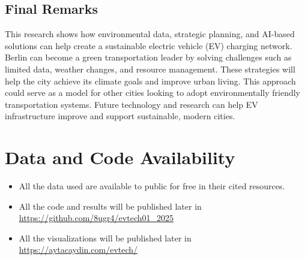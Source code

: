 \subsection{Final Remarks}
This research shows how environmental data, strategic planning, and AI-based solutions can help create a sustainable electric vehicle (EV) charging network. Berlin can become a green transportation leader by solving challenges such as limited data, weather changes, and resource management. These strategies will help the city achieve its climate goals and improve urban living. This approach could serve as a model for other cities looking to adopt environmentally friendly transportation systems. Future technology and research can help EV infrastructure improve and support sustainable, modern cities.
\section{Data and Code Availability}
\begin{itemize}
    \item All the data used are available to public for free in their cited resources.
    \item All the code and results will be published later in \url{https://github.com/8ugr4/evtech01_2025}
    \item All the visualizations will be published later in \url{https://aytacaydin.com/evtech/}
\end{itemize}
